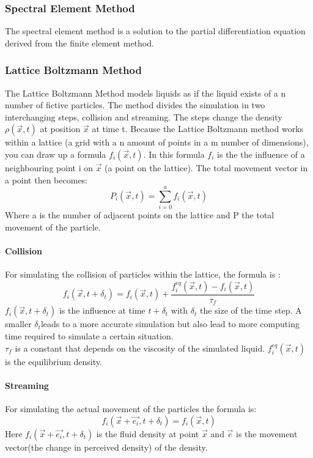\documentclass{article}
\begin{document}
\subsubsection{Spectral Element Method}
The spectral element method is a solution to the partial differentiation equation derived from the finite element method.
\subsubsection{Lattice Boltzmann Method}
The Lattice Boltzmann Method models liquids as if the liquid exists of a n number of fictive particles. The method divides the simulation in two interchanging steps, collision and streaming. The steps change the density $\rho{(\vec{x},t)}$ at position $\vec{x}$ at time t. Because the Lattice Boltzmann method works within a lattice (a grid with a n amount of points in a m number of dimensions), you can draw up a formula $f_{i}(\vec{x},t)$. In this formula $f_{i}$ is the the influence of a neighbouring point i on $\vec{x}$ (a point on the lattice). The total movement vector in a point then becomes: \[P_{i}(\vec{x},t) = \sum_{i=0}^{a}f_{i}(\vec{x},t)\] Where a is the number of adjacent points on the lattice and P the total movement of the particle.

\paragraph{Collision} %
For simulating the collision of particles within the lattice, the formula is \cite{Lattice Boltzmann implementation}:
\[f_{i}(\vec{x}, t + \delta_t) = f_{i}(\vec{x}, t) + \frac{f_{i}^{eq}(\vec{x},t) - f_{i}(\vec{x},t)}{\tau_{f}}\]
$f_{i}(\vec{x}, t + \delta_t)$ is the influence at time $t + \delta_t$ with $\delta_t$ the size of the time step. A smaller $\delta_t$leads to a more accurate simulation but also lead to more computing time required to simulate a certain situation. \\
$\tau_{f}$ is a constant that depends on the viscosity of the simulated liquid. $f_{i}^{eq}(\vec{x},t)$ is the equilibrium density.
\paragraph{Streaming}
For simulating the actual movement of the particles the formula is: 
\[f_{i}(\vec{x}+\vec{e_i},t + \delta_t) = f_{i}(\vec{x},t)\]
Here $f_{i}(\vec{x}+\vec{e_i},t + \delta_t)$ is the fluid density at point $\vec{x}$ and $\vec{e}$ is the movement vector(the change in perceived density) of the density.
\end{document}
